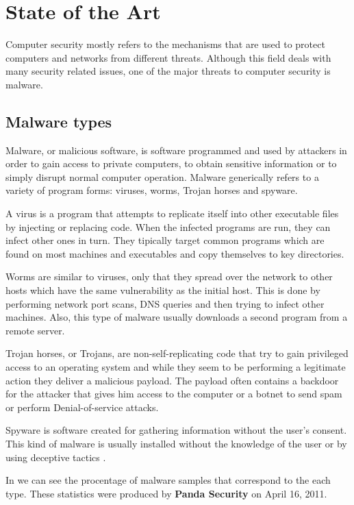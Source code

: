 \chapter{State of the Art}
\label{chapter:second-chapter}

Computer security mostly refers to the mechanisms that are used to protect computers and networks from different threats. Although this field deals with many security related issues, one of the major threats to computer security is malware.

\section{Malware types}
\label{sec:mal-types}

Malware, or malicious software, is software programmed and used by attackers in order to gain access to private computers, to obtain sensitive information or to simply disrupt normal computer operation. Malware generically refers to a variety of program forms: viruses, worms, Trojan horses and spyware.

A virus is a program that attempts to replicate itself into other executable files by injecting or replacing code. When the infected programs are run, they can infect other ones in turn. They tipically target common programs which are found on most machines and executables and copy themselves to key directories.

Worms are similar to viruses, only that they spread over the network to other hosts which have the same vulnerability as the initial host. This is done by performing network port scans, DNS queries and then trying to infect other machines. Also, this type of malware usually downloads a second program from a remote server.

Trojan horses, or Trojans, are non-self-replicating code that try to gain privileged access to an operating system and while they seem to be performing a legitimate action they deliver a malicious payload. The payload often contains a backdoor for the attacker that gives him access to the computer or a botnet to send spam or perform Denial-of-service attacks.

Spyware is software created for gathering information without the user's consent. This kind of malware is usually installed without the knowledge of the user or by using deceptive tactics \cite{mal-behavior-analysis}.	

In  we can see the procentage of malware samples that correspond to the each type. These statistics were produced by \textbf{Panda Security} on April 16, 2011.

